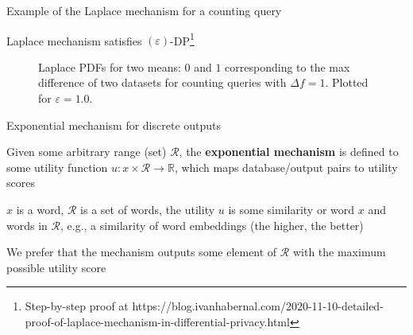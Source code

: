 \documentclass[12pt,aspectratio=169,handout]{beamer}
\begin{document}
\begin{frame}{Example of the Laplace mechanism for a counting query}

Laplace mechanism satisfies $(\varepsilon)$-DP\footnote{
Step-by-step proof at	https://blog.ivanhabernal.com/2020-11-10-detailed-proof-of-laplace-mechanism-in-differential-privacy.html}

\begin{figure}
	\caption{Laplace PDFs for two means: $0$ and $1$ corresponding to the max difference of two datasets for counting queries with $\Delta f = 1$. Plotted for $\varepsilon = 1.0$.}
\end{figure}



\end{frame}

\begin{frame}{Exponential mechanism for discrete outputs}

Given some arbitrary range (set) $\mathcal{R}$, the \textbf{exponential mechanism} is defined to some utility function $u: x \times \mathcal{R} \to \mathbb{R}$, which maps database/output pairs to utility scores

\begin{example}
$x$ is a word, $\mathcal{R}$ is a set of words, the utility $u$ is some similarity or word $x$ and words in $\mathcal{R}$, e.g., a similarity of word embeddings (the higher, the better)
\end{example}

We prefer that the mechanism outputs some element of $\mathcal{R}$ with the maximum possible utility score



\end{frame}
\end{document}
